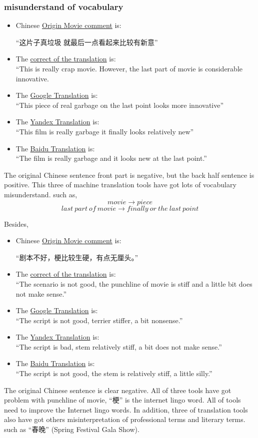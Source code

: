 \documentclass[conference]{IEEEtran}
\begin{document}
\begin{CJK*}{UTF8}{gbsn}
 \subsubsection{misunderstand of vocabulary}
\begin{itemize}
\item Chinese \underline{Origin Movie comment} is:
  \begin{center}
    ``这片子真垃圾 就最后一点看起来比较有新意''
  \end{center}
\item The \underline{correct of the translation} is:\\
  ``This is really crap movie. However, the last part of movie is considerable innovative.
\item The \underline{Google Translation} is:\\
  ``This piece of real garbage on the last point looks more innovative''
\item The \underline{Yandex Translation} is:\\
  ``This film is really garbage it finally looks relatively new''
\item The \underline{Baidu Translation} is:\\
  ``The film is really garbage and it looks new at the last point.''
\end{itemize}
The original Chinese sentence front part is negative, but the back half sentence
is positive. This three of machine translation tools have got lots of vocabulary
misunderstand. such as, $$ movie \rightarrow piece $$ $$last\ part\ of\ movie \rightarrow finally\
or\ the\ last\ point$$

Besides,
\begin{itemize}
\item Chinese \underline{Origin Movie comment} is:
  \begin{center}
    ``剧本不好，梗比较生硬，有点无厘头。''
  \end{center}
\item The \underline{correct of the translation} is:\\
  ``The scenario is not good, the punchline of movie is stiff and a little bit
  does not make sense.''
\item The \underline{Google Translation} is:\\
  ``The script is not good, terrier stiffer, a bit nonsense.''
\item The \underline{Yandex Translation} is:\\
  ``The script is bad, stem relatively stiff, a bit does not make sense.''
\item The \underline{Baidu Translation} is:\\
  ``The script is not good, the stem is relatively stiff, a little silly.''
\end{itemize}
The original Chinese sentence is clear negative. All of three tools have got
problem with punchline of movie, ``梗'' is the internet lingo word. All of tools
need to improve the Internet lingo words. In addition, three of translation
tools also have got others misinterpretation of professional terms and literary
terms. such as ``春晚'' (Spring Festival Gala Show).


\end{CJK*}
\end{document}
